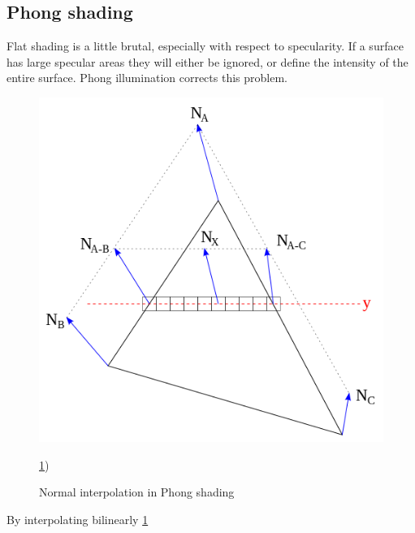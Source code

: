 \subsection{Phong shading}
Flat shading is a little brutal, especially with respect to specularity. If a
surface has large specular areas they will either be ignored, or define the
intensity of the entire surface. Phong illumination corrects this problem.

\begin{figure}[htb]
	\centering
	\scalebox{0.5}
	{\includegraphics{pics/phongInterpol.png}}
	\caption{Normal interpolation in Phong shading}
	\label{fig:phongInterpo}
\ref{fig:phongInterpo})
\end{figure}
By interpolating bilinearly \ref{fig:phongInterpo}
